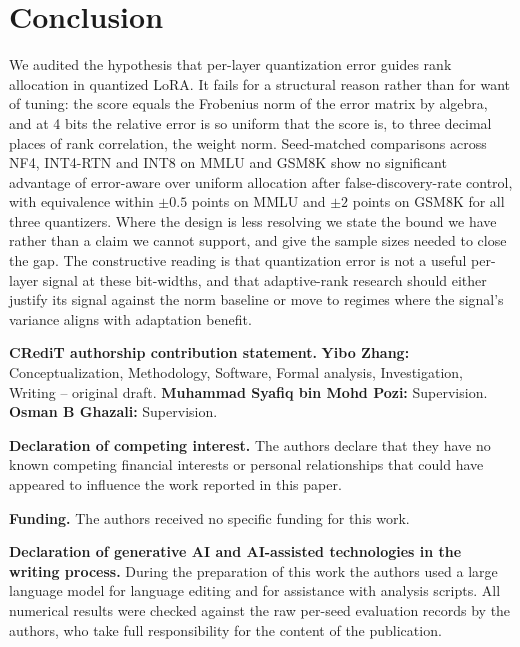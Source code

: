 \documentclass[preprint,12pt]{elsarticle}
\begin{document}
\section{Conclusion}
\label{sec:conclusion}

We audited the hypothesis that per-layer quantization error guides rank allocation in quantized LoRA. It fails for a structural reason rather than for want of tuning: the score equals the Frobenius norm of the error matrix by algebra, and at 4 bits the relative error is so uniform that the score is, to three decimal places of rank correlation, the weight norm. Seed-matched comparisons across NF4, INT4-RTN and INT8 on MMLU and GSM8K show no significant advantage of error-aware over uniform allocation after false-discovery-rate control, with equivalence within $\pm 0.5$ points on MMLU and $\pm 2$ points on GSM8K for all three quantizers. Where the design is less resolving we state the bound we have rather than a claim we cannot support, and give the sample sizes needed to close the gap. The constructive reading is that quantization error is not a useful per-layer signal at these bit-widths, and that adaptive-rank research should either justify its signal against the norm baseline or move to regimes where the signal's variance aligns with adaptation benefit.

\noindent\textbf{CRediT authorship contribution statement.} {\small\textbf{Yibo Zhang:} Conceptualization, Methodology, Software, Formal analysis, Investigation, Writing -- original draft. \textbf{Muhammad Syafiq bin Mohd Pozi:} Supervision. \textbf{Osman B Ghazali:} Supervision.}

\noindent\textbf{Declaration of competing interest.} {\small The authors declare that they have no known competing financial interests or personal relationships that could have appeared to influence the work reported in this paper.}

\noindent\textbf{Funding.} {\small The authors received no specific funding for this work.}

\noindent\textbf{Declaration of generative AI and AI-assisted technologies in the writing process.} {\small During the preparation of this work the authors used a large language model for language editing and for assistance with analysis scripts. All numerical results were checked against the raw per-seed evaluation records by the authors, who take full responsibility for the content of the publication.}
\end{document}
